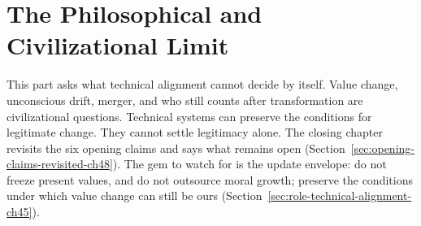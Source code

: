 \part{The Philosophical and Civilizational Limit}

This part asks what technical alignment cannot decide by itself.
Value change, unconscious drift, merger, and who still counts after transformation are civilizational questions.
Technical systems can preserve the conditions for legitimate change.
They cannot settle legitimacy alone.
The closing chapter revisits the six opening claims and says what remains open (Section~\ref{sec:opening-claims-revisited-ch48}).
The gem to watch for is the update envelope: do not freeze present values, and do not outsource moral growth; preserve the conditions under which value change can still be ours (Section~\ref{sec:role-technical-alignment-ch45}).





